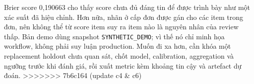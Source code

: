 Brier score 0,190663 cho thấy score chưa đủ đáng tin để được trình bày như một xác suất đã hiệu chỉnh. Hơn nữa, nhãn ở cấp đơn được gán cho các item trong đơn, nên không thể từ score item suy ra item nào là nguyên nhân của review thấp. Bản demo dùng snapshot \texttt{SYNTHETIC\_DEMO}; vì thế nó chỉ minh họa workflow, không phải suy luận production. Muốn đi xa hơn, cần khóa một replacement holdout chưa quan sát, chốt model, calibration, aggregation và ngưỡng trước khi đánh giá, rồi xuất metric kèm khoảng tin cậy và artefact dự đoán.
>>>>>>> 7b6c164 (update c4 & c6)
